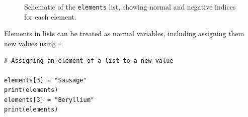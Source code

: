 \documentclass[a4paper]{article}
\begin{document}
\begin{figure}[tb]
  \centering
    \caption{\label{fig:list_indexing}Schematic of the \texttt{elements} list, showing normal and negative indices for each element.}
\end{figure}
Elements in lists can be treated as normal variables, including assigning them new values using \texttt{=}
\begin{lstlisting}
# Assigning an element of a list to a new value

elements[3] = "Sausage"
print(elements)
elements[3] = "Beryllium"
print(elements)
\end{lstlisting}
\end{document}
